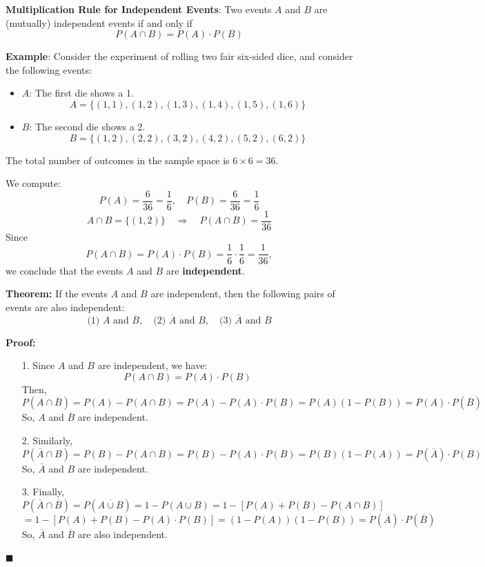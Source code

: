 \documentclass[twoside]{book}
\begin{document}
\begin{textbox}
\textbf{Multiplication Rule for Independent Events}: Two events $A$ and $B$ are (mutually) independent events if and only if
$$P( A \cap B ) = P( A ) \cdot P( B )$$
\end{textbox}

\textbf{Example}: Consider the experiment of rolling two fair six-sided dice, and consider the following events:
\begin{itemize}
    \item \( A \): The first die shows a 1.
    \[ A = \{(1,1), (1,2), (1,3), (1,4), (1,5), (1,6)\} \]
    \item \( B \): The second die shows a 2.
    \[ B = \{(1,2), (2,2), (3,2), (4,2), (5,2), (6,2)\} \]
\end{itemize}

The total number of outcomes in the sample space is \( 6 \times 6 = 36 \).

We compute:
\[
P(A) = \frac{6}{36} = \frac{1}{6}, \quad P(B) = \frac{6}{36} = \frac{1}{6}
\]
\[
A \cap B = \{(1,2)\} \quad \Rightarrow \quad P(A \cap B) = \frac{1}{36}
\]
Since
\[
P(A \cap B) = P(A) \cdot P(B) = \frac{1}{6} \cdot \frac{1}{6} = \frac{1}{36},
\]
we conclude that the events \( A \) and \( B \) are \textbf{independent}.

\begin{textbox}
\textbf{Theorem:}
If the events \( A \) and \( B \) are independent, then the following pairs of events are also independent:
\[
\text{(1) } A \text{ and } \overline{B}, \quad \text{(2) } \overline{A} \text{ and } B, \quad \text{(3) } \overline{A} \text{ and } \overline{B}
\]
\end{textbox}
\textbf{Proof:}

\begin{itemize}
  \item[1.] Since \( A \) and \( B \) are independent, we have:
  \[
  P(A \cap B) = P(A)\cdot P(B)
  \]
  Then,
  \[
  P(A \cap \overline{B}) = P(A) - P(A \cap B) = P(A) - P(A)\cdot P(B) = P(A)(1 - P(B)) = P(A)\cdot P(\overline{B})
  \]
  So, \( A \) and \( \overline{B} \) are independent.

  \item[2.] Similarly,
  \[
  P(\overline{A} \cap B)  = P(B) - P(A \cap B) = P(B) - P(A)\cdot P(B) = P(B)(1 - P(A)) = P(\overline{A})\cdot P(B)
  \]
  So, \( \overline{A} \) and \( B \) are independent.

  \item[3.] Finally,
  \[
  P(\overline{A} \cap \overline{B}) = P(\overline{A \cup B}) = 1 - P(A \cup B) = 1 - [P(A) + P(B) - P(A \cap B)]
  \]
  \[
  = 1 - [P(A) + P(B) - P(A)\cdot P(B)] = (1 - P(A))(1 - P(B)) = P(\overline{A})\cdot P(\overline{B})
  \]
  So, \( \overline{A} \) and \( \overline{B} \) are also independent.
\end{itemize}
\hfill\(\blacksquare\)
\end{document}

